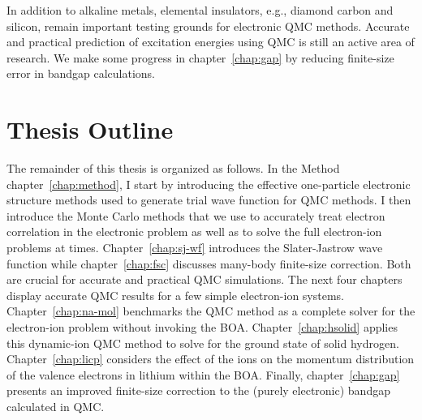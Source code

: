 In addition to alkaline metals, elemental insulators, e.g., diamond carbon and silicon, remain important testing grounds for electronic QMC methods. Accurate and practical prediction of excitation energies using QMC is still an active area of research. We make some progress in chapter~\ref{chap:gap} by reducing finite-size error in bandgap calculations.

\section{Thesis Outline}
The remainder of this thesis is organized as follows. In the Method chapter~\ref{chap:method}, I start by introducing the effective one-particle electronic structure methods used to generate trial wave function for QMC methods.
I then introduce the Monte Carlo methods that we use to accurately treat electron correlation in the electronic problem as well as to solve the full electron-ion problems at times.
Chapter~\ref{chap:sj-wf} introduces the Slater-Jastrow wave function while chapter~\ref{chap:fsc} discusses many-body finite-size correction.
Both are crucial for accurate and practical QMC simulations.
The next four chapters display accurate QMC results for a few simple electron-ion systems.
Chapter~\ref{chap:na-mol} benchmarks the QMC method as a complete solver for the electron-ion problem without invoking the BOA.
Chapter~\ref{chap:hsolid} applies this dynamic-ion QMC method to solve for the ground state of solid hydrogen.
Chapter~\ref{chap:licp} considers the effect of the ions on the momentum distribution of the valence electrons in lithium within the BOA.
Finally, chapter~\ref{chap:gap} presents an improved finite-size correction to the (purely electronic) bandgap calculated in QMC.